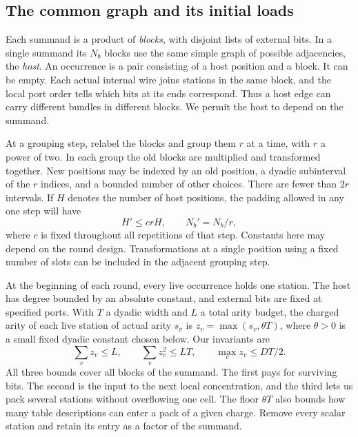 \subsection{The common graph and its initial loads}
Each summand is a product of \emph{blocks}, with disjoint lists of
external bits. In a single summand its $N_b$ blocks use the same simple
graph of possible adjacencies, the \emph{host}. An occurrence is a
pair consisting of a host position and a block. It can be empty. Each
actual internal wire joins stations in the same block, and the local
port order tells which bits at its ends correspond. Thus a host edge can
carry different bundles in different blocks. We permit the host to depend
on the summand.

At a grouping step, relabel the blocks and group them $r$ at a time, with
$r$ a power of two. In each group the old blocks are multiplied and
transformed together. New positions may be indexed by an old position, a
dyadic subinterval of the $r$ indices, and a bounded number of other
choices. There are fewer than $2r$ intervals. If $H$ denotes the number
of host positions, the padding allowed in any one step will have
\begin{equation}\label{eq:round-occurrence}
 H'\le c rH, \qquad N_b'=N_b/r,
\end{equation}
where $c$ is fixed throughout all repetitions of that step. Constants here
may depend on the round design. Transformations at a single position using
a fixed number of slots can be included in the adjacent grouping step.

At the beginning of each round, every live occurrence holds one station.
The host has degree bounded by an absolute constant, and external bits are fixed at
specified ports. With $T$ a dyadic width and $L$ a total arity budget,
the charged arity of each live station of actual arity $s_v$ is
$z_v=\max(s_v,\theta T)$, where $\theta>0$ is a small fixed dyadic
constant chosen below. Our invariants are
\begin{equation}\label{eq:round-invariants}
 \sum_v z_v\le L,\qquad \sum_v z_v^2\le LT,\qquad
 \max_v z_v\le DT/2 .
\end{equation}
All three bounds cover all blocks of the summand. The first pays for
surviving bits. The second is the input to the next local concentration,
and the third lets us pack several stations without overflowing one
cell. The floor $\theta T$ also bounds how many table descriptions can
enter a pack of a given charge. Remove every scalar station and retain
its entry as a factor of the summand.

